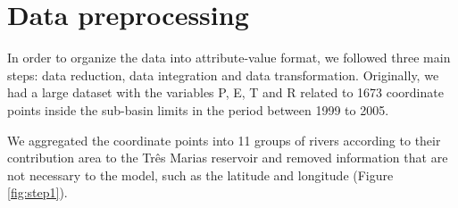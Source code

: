 \documentclass[12pt]{article}
\begin{document}
\begin{table}[htbp]
    \centering
    \caption{Outcome variables made available by ONS \cite{onsnivel,onsvazao}}
    \label{tab:outcomes}
    \label{tab:my_label}
\end{table}





\section{Data preprocessing}

In order to organize the data into attribute-value format, we followed three main steps: data reduction, data integration and data transformation. Originally, we had a large dataset with the variables P, E, T and R related to 1673 coordinate points inside the sub-basin limits in the period between 1999 to 2005.

We aggregated the coordinate points into 11 groups of rivers according to their contribution area to the Três Marias reservoir and removed information that are not necessary to the model, such as the latitude and longitude (Figure \ref{fig:step1}).
\end{document}
